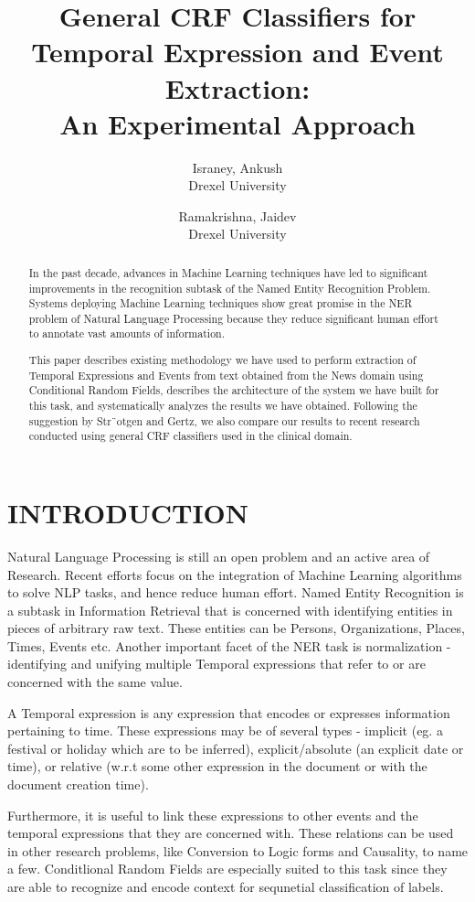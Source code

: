 \documentclass[letterpaper, 10 pt, conference]{ieeeconf}
\title{\LARGE \bf
General CRF Classifiers for Temporal Expression and Event Extraction: \\ An Experimental Approach
}
\author{
  Israney, Ankush\\
  Drexel University
  \and
  Ramakrishna, Jaidev\\
  Drexel University
}
\begin{document}
\maketitle
\thispagestyle{empty}
\pagestyle{empty}

\begin{abstract}
In the past decade, advances in Machine Learning techniques have led to significant improvements in the recognition subtask of the Named Entity Recognition Problem. Systems deploying Machine Learning techniques show great promise in the NER problem of Natural Language Processing because they reduce significant human effort to annotate vast amounts of information.

This paper describes existing methodology we have used to perform extraction of Temporal Expressions and Events from text obtained from the News domain using Conditional Random Fields, describes the architecture of the system we have built for this task, and systematically analyzes the results we have obtained. Following the suggestion by Str¨otgen and Gertz\cite{c7}, we also compare our results to recent research conducted using general CRF classifiers used in the clinical domain.

\end{abstract}

\section{INTRODUCTION}

Natural Language Processing is still an open problem and an active area of Research. Recent efforts focus on the integration of Machine Learning algorithms to solve NLP tasks, and hence reduce human effort. Named Entity Recognition is a subtask in Information Retrieval that is concerned with identifying entities in pieces of arbitrary raw text. These entities can be Persons, Organizations, Places, Times, Events etc.  Another important facet of the NER task is normalization - identifying and unifying multiple Temporal expressions that refer to or are concerned with the same value.

A Temporal expression is any expression that encodes or expresses information pertaining to time. These expressions may be of several types - implicit (eg. a festival or holiday which are to be inferred), explicit/absolute (an explicit date or time), or relative (w.r.t some other expression in the document or with the document creation time).

Furthermore, it is useful to link these expressions to other events and the temporal expressions that they are concerned with. These relations can be used in other research problems, like Conversion to Logic forms and Causality, to name a few. Conditlional Random Fields are especially suited to this task since they are able to recognize and encode context for sequnetial classification of labels\cite{c6}.
\end{document}
